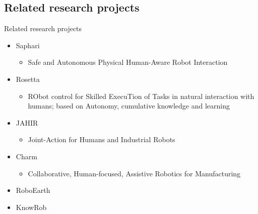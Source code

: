 \subsection{Related research projects}
\begin{frame}{Related research projects}
	\begin{itemize}
		\item Saphari
		\begin{itemize}
			\item Safe and Autonomous Physical Human-Aware Robot Interaction
		\end{itemize}
		\item Rosetta
		\begin{itemize}
			\item RObot control for Skilled ExecuTion of Tasks in natural interaction with humans; based on Autonomy, cumulative knowledge and learning
		\end{itemize}
		\item JAHIR
		\begin{itemize}
			\item Joint-Action for Humans and Industrial Robots
		\end{itemize}
		\item Charm
		\begin{itemize}
			\item Collaborative, Human-focused, Assistive Robotics for Manufacturing
		\end{itemize}
		\item RoboEarth
		\item KnowRob
	\end{itemize}
\end{frame}

